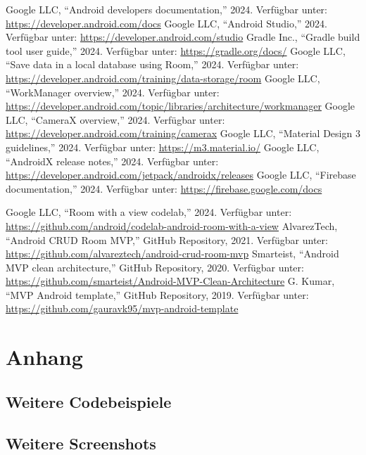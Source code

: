 \documentclass[14pt,a4paper]{report}
\begin{document}
\begin{thebibliography}{99}
     Google LLC, ``Android developers documentation,'' 2024. Verfügbar unter: \url{https://developer.android.com/docs}
     Google LLC, ``Android Studio,'' 2024. Verfügbar unter: \url{https://developer.android.com/studio}
     Gradle Inc., ``Gradle build tool user guide,'' 2024. Verfügbar unter: \url{https://gradle.org/docs/}
     Google LLC, ``Save data in a local database using Room,'' 2024. Verfügbar unter: \url{https://developer.android.com/training/data-storage/room}
     Google LLC, ``WorkManager overview,'' 2024. Verfügbar unter: \url{https://developer.android.com/topic/libraries/architecture/workmanager}
     Google LLC, ``CameraX overview,'' 2024. Verfügbar unter: \url{https://developer.android.com/training/camerax}
     Google LLC, ``Material Design 3 guidelines,'' 2024. Verfügbar unter: \url{https://m3.material.io/}
     Google LLC, ``AndroidX release notes,'' 2024. Verfügbar unter: \url{https://developer.android.com/jetpack/androidx/releases}
     Google LLC, ``Firebase documentation,'' 2024. Verfügbar unter: \url{https://firebase.google.com/docs}
    
     Google LLC, ``Room with a view codelab,'' 2024. Verfügbar unter: \url{https://github.com/android/codelab-android-room-with-a-view}
     AlvarezTech, ``Android CRUD Room MVP,'' GitHub Repository, 2021. Verfügbar unter: \url{https://github.com/alvareztech/android-crud-room-mvp}
     Smarteist, ``Android MVP clean architecture,'' GitHub Repository, 2020. Verfügbar unter: \url{https://github.com/smarteist/Android-MVP-Clean-Architecture}
     G. Kumar, ``MVP Android template,'' GitHub Repository, 2019. Verfügbar unter: \url{https://github.com/gauravk95/mvp-android-template}
\end{thebibliography}

\appendix
\chapter{Anhang}
\section{Weitere Codebeispiele}
% 

\section{Weitere Screenshots}
\end{document}
